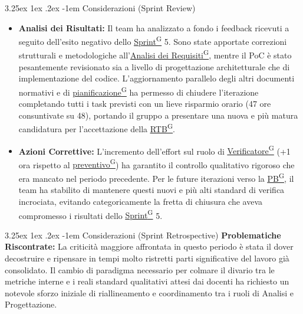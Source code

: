 \documentclass[a4paper,12pt]{article}
\makeatletter
\renewcommand\paragraph{\@startsection{paragraph}{5}{\z@}%
  {3.25ex \@plus1ex \@minus.2ex}%
  {-1em}%
  {\normalfont\normalsize\bfseries}}
\providecommand{\glslink}[2]{\href{https://alittlebyte-19.github.io/Documentazione/glossario.html\#gls-#1}{\underline{#2}\textsuperscript{\scriptsize G}}}
\makeatother
\begin{document}
\paragraph{Considerazioni (Sprint Review)}
\begin{itemize}
    \item \textbf{Analisi dei Risultati:} Il team ha analizzato a fondo i feedback ricevuti a seguito dell'esito negativo dello \glslink{sprint}{Sprint} 5. Sono state apportate correzioni strutturali e metodologiche all'\glslink{analisi-dei-requisiti-adr}{Analisi dei Requisiti}, mentre il PoC è stato pesantemente revisionato sia a livello di progettazione architetturale che di implementazione del codice. L'aggiornamento parallelo degli altri documenti normativi e di \glslink{pianificazione}{pianificazione} ha permesso di chiudere l'iterazione completando tutti i task previsti con un lieve risparmio orario (47 ore consuntivate su 48), portando il gruppo a presentare una nuova e più matura candidatura per l'accettazione della \glslink{rtb-requirements-and-technology-baseline}{RTB}.
    \item \textbf{Azioni Correttive:} L'incremento dell'effort sul ruolo di \glslink{verificatore}{Verificatore} (+1 ora rispetto al \glslink{preventivo}{preventivo}) ha garantito il controllo qualitativo rigoroso che era mancato nel periodo precedente. Per le future iterazioni verso la \glslink{pb-product-baseline}{PB}, il team ha stabilito di mantenere questi nuovi e più alti standard di verifica incrociata, evitando categoricamente la fretta di chiusura che aveva compromesso i risultati dello \glslink{sprint}{Sprint} 5.
\end{itemize}

\paragraph{Considerazioni (Sprint Retrospective)}
\textbf{Problematiche Riscontrate:} La criticità maggiore affrontata in questo periodo è stata il dover decostruire e ripensare in tempi molto ristretti parti significative del lavoro già consolidato. Il cambio di paradigma necessario per colmare il divario tra le metriche interne e i reali standard qualitativi attesi dai docenti ha richiesto un notevole sforzo iniziale di riallineamento e coordinamento tra i ruoli di Analisi e Progettazione.
\end{document}
